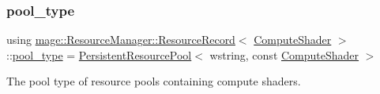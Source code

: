 \subsubsection{\texorpdfstring{pool\+\_\+type}{pool\_type}}
{\footnotesize\ttfamily using \hyperlink{structmage_1_1_resource_manager_1_1_resource_record}{mage\+::\+Resource\+Manager\+::\+Resource\+Record}$<$ \hyperlink{namespacemage_ae040329401484b076f0cd1a7c43d19c9}{Compute\+Shader} $>$\+::\hyperlink{structmage_1_1_resource_manager_1_1_resource_record_3_01_compute_shader_01_4_a3fa00db899c9383720d711280ca50760}{pool\+\_\+type} =  \hyperlink{classmage_1_1_persistent_resource_pool}{Persistent\+Resource\+Pool}$<$ wstring, const \hyperlink{namespacemage_ae040329401484b076f0cd1a7c43d19c9}{Compute\+Shader} $>$}

The pool type of resource pools containing compute shaders. 